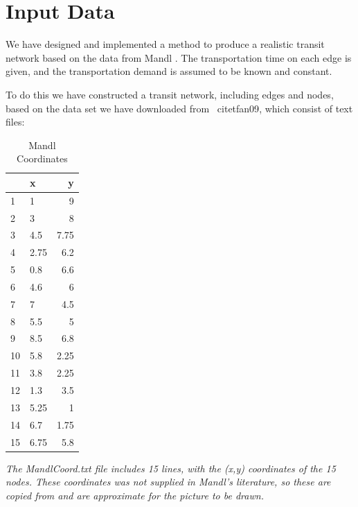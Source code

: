 \section{Input Data}


We have designed and implemented a method to produce a realistic transit network based on the data from Mandl \citep{mandl79}. The transportation time on each edge is given, and the transportation demand is assumed to be known and constant. 

To do this we have constructed a transit network, including edges and nodes, based on the data set we have downloaded from \
citet{fan09}, which consist of text files:




\begin{table}[h!]

    \begin{tabular}{|l|lr|}

 	\hline
 	~ & x & y \\
 	\hline
    1 & 1 & 9 \\
    2 & 3 & 8 \\
    3 & 4.5 & 7.75 \\
    4 & 2.75 & 6.2 \\
    5 & 0.8 & 6.6 \\
    6 & 4.6 & 6 \\
    7 & 7 & 4.5 \\
    8 & 5.5 & 5 \\
    9 & 8.5 & 6.8 \\
    10 & 5.8 & 2.25 \\
    11 & 3.8 & 2.25 \\
    12 & 1.3 & 3.5 \\
	13 & 5.25 & 1 \\
	14 & 6.7 & 1.75 \\
	15 & 6.75 & 5.8 \\
	\hline
    \end{tabular}
    \caption {Mandl Coordinates}
\textit{The MandlCoord.txt file includes 15 lines, with the (x,y) coordinates of the 15 nodes. These coordinates was not supplied in Mandl's literature, so these are copied from \citet{fan09} and are approximate for the picture to be drawn.}
\end{table}


